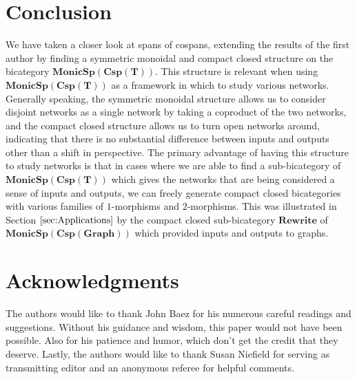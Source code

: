 \documentclass{tac}
\newcommand{\cat}[1]{\mathbf{#1}}
\newcommand{\bimonspcsp}[1]{\mathbf{MonicSp(Csp(#1))}}
\theoremstyle{remark}
\theoremstyle{definition}
\begin{document}
\section{Conclusion} 
\label{sec:Conclusion}

We have taken a closer look at 
spans of cospans, 
extending the results of
the first author \cite{Cic}
by finding a symmetric monoidal
and compact closed structure
on the bicategory $\bimonspcsp{T}$.
This structure is relevant
when using $\bimonspcsp{T}$ as 
a framework in which to study
various networks.  Generally speaking,
the symmetric monoidal structure
allows us to consider disjoint networks
as a single network by taking a coproduct of the two networks,
and the compact closed structure allows us 
to turn open networks around, 
indicating that there is no
substantial difference between
inputs and outputs
other than a shift in perspective.  
The primary advantage of 
having this structure 
to study networks is that
in cases where we are able to find a sub-bicategory
of $\bimonspcsp{T}$
which gives the networks that are being considered
a sense of
inputs and outputs,
we can freely generate compact closed
bicategories with various families
of $1$-morphisms and $2$-morphisms.
This was illustrated
in Section $\ref{sec:Applications}$
by the compact closed sub-bicategory
$\cat{Rewrite}$ of $\mathbf{MonicSp(Csp(Graph))}$
which provided inputs and outputs 
to graphs.

\section{Acknowledgments}
The authors would like to thank John Baez for his numerous careful readings and suggestions. Without his guidance and wisdom, this paper would not have been possible. Also for his patience and humor, which don't get the credit that they deserve. Lastly, the authors would like to thank Susan Niefield for serving as transmitting editor and an anonymous referee for helpful comments.

%
%
\end{document}
